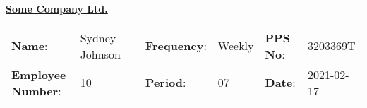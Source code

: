 \documentclass{article}
\begin{document}

\Huge{\underline{\textbf{Some Company Ltd.}}}

\begin{table}[h]
    \centering
    \begin{tabular}{lllllll}
        \textbf{Name}:              & Sydney Johnson   &  & \textbf{Frequency}: & Weekly        & \textbf{PPS No}: & 3203369T \\
        \textbf{Employee Number}:   & 10 &  & \textbf{Period}:    & 07 & \textbf{Date}:   & 2021-02-17
    \end{tabular}
\end{table}

\vspace{-5mm}
\end{document}
